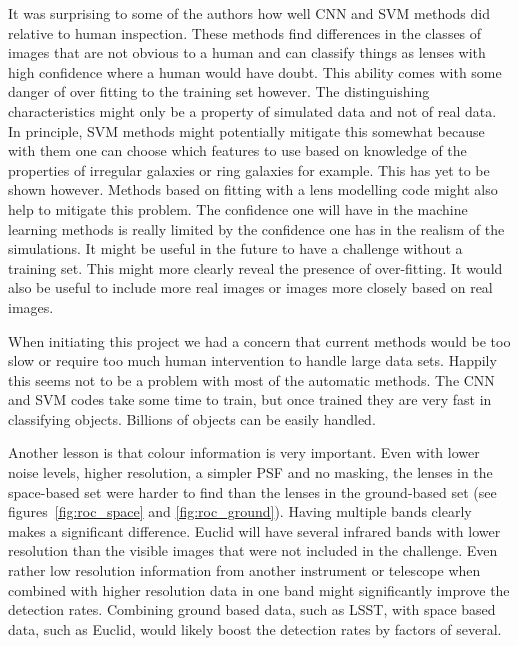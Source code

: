 \documentclass{aa}
\begin{document}
It was surprising to some of the authors how well CNN and SVM methods did relative to human inspection.  These methods find differences in the classes of images that are not obvious to a human and can classify things as lenses with high confidence where a human would have doubt. 
This ability comes with some danger of over fitting to the training set however.  The distinguishing characteristics might only be a property of simulated data and not of real data.  In principle, SVM methods might potentially mitigate this somewhat because with them one can choose which features to use based on knowledge of the properties of irregular galaxies or ring galaxies for example.  This has yet to be shown however.  Methods based on fitting with a lens modelling code \citep{2009ApJ...694..924M,2017arXiv170401585S} might also help to mitigate this problem.
The confidence one will have in the machine learning methods is really limited by the confidence one has in the realism of the simulations.   It might be useful in the future to have a challenge without a training set.  This might more clearly reveal the presence of over-fitting.  
It would also be useful to include more real images or images more closely based on real images.

When initiating this project we had a concern that current methods would be too slow or require too much human intervention to handle large data sets.  Happily this seems not to be a problem with most of the automatic methods.  The CNN and SVM codes take some time to train, but once trained they are very fast in classifying objects.  Billions of objects can be easily handled.

Another lesson is that colour information is very important.  Even with lower noise levels, higher resolution, a simpler PSF and no masking, the lenses in the space-based set were harder to find than the lenses in the ground-based set (see figures~\ref{fig:roc_space} and \ref{fig:roc_ground}).  Having multiple bands clearly makes a significant difference.  Euclid will have several infrared bands with lower resolution than the visible images that were not included in the challenge.  Even rather low resolution information from another instrument or telescope when combined with higher resolution data in one band might significantly improve the detection rates.  Combining ground based data, such as LSST, with space based data, such as Euclid, would likely boost the detection rates by factors of several.
\end{document}
